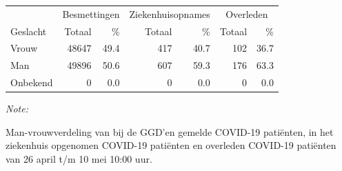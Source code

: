 \documentclass[
  english,
  man,floatsintext]{apa6}
\begin{document}
\begin{table}
\centering\begingroup\fontsize{11}{13}\selectfont

\begin{threeparttable}
\begin{tabular}{lrrrrrr}
\toprule
\multicolumn{1}{c}{ } & \multicolumn{2}{c}{Besmettingen} & \multicolumn{2}{c}{Ziekenhuisopnames} & \multicolumn{2}{c}{Overleden} \\
\cmidrule(l{3pt}r{3pt}){2-3} \cmidrule(l{3pt}r{3pt}){4-5} \cmidrule(l{3pt}r{3pt}){6-7}
Geslacht & Totaal & \% & Totaal & \% & Totaal & \%\\
\midrule
Vrouw & 48647 & 49.4 & 417 & 40.7 & 102 & 36.7\\
Man & 49896 & 50.6 & 607 & 59.3 & 176 & 63.3\\
Onbekend & 0 & 0.0 & 0 & 0.0 & 0 & 0.0\\
\bottomrule
\end{tabular}
\begin{tablenotes}
\item \textit{Note: } 
\item Man-vrouwverdeling van bij de GGD’en gemelde COVID-19 patiënten, in het ziekenhuis opgenomen COVID-19 patiënten en overleden COVID-19 patiënten van 26 april t/m 10 mei 10:00 uur.
\end{tablenotes}
\end{threeparttable}
\endgroup{}
\end{table}
\newpage
\end{document}
